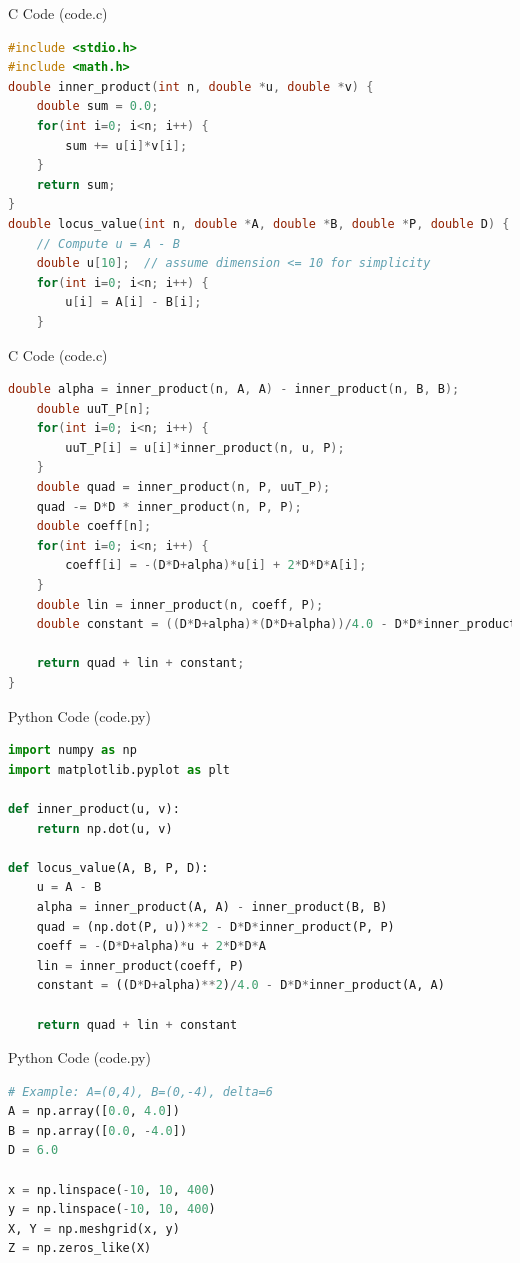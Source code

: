 \documentclass{beamer}
\begin{document}
\begin{frame}[fragile]{C Code (code.c)}
\begin{lstlisting}[language=C]
#include <stdio.h>
#include <math.h>
double inner_product(int n, double *u, double *v) {
    double sum = 0.0;
    for(int i=0; i<n; i++) {
        sum += u[i]*v[i];
    }
    return sum;
}
double locus_value(int n, double *A, double *B, double *P, double D) {
    // Compute u = A - B
    double u[10];  // assume dimension <= 10 for simplicity
    for(int i=0; i<n; i++) {
        u[i] = A[i] - B[i];
    }
\end{lstlisting}
\end{frame}
\begin{frame}[fragile]{C Code (code.c)}
\begin{lstlisting}[language=C]
    double alpha = inner_product(n, A, A) - inner_product(n, B, B);
    double uuT_P[n];
    for(int i=0; i<n; i++) {
        uuT_P[i] = u[i]*inner_product(n, u, P);
    }
    double quad = inner_product(n, P, uuT_P);
    quad -= D*D * inner_product(n, P, P);
    double coeff[n];
    for(int i=0; i<n; i++) {
        coeff[i] = -(D*D+alpha)*u[i] + 2*D*D*A[i];
    }
    double lin = inner_product(n, coeff, P);
    double constant = ((D*D+alpha)*(D*D+alpha))/4.0 - D*D*inner_product(n, A, A);

    return quad + lin + constant;
}
\end{lstlisting}
\end{frame}

\begin{frame}[fragile]{Python Code (code.py)}
\begin{lstlisting}[language=Python]
import numpy as np
import matplotlib.pyplot as plt

def inner_product(u, v):
    return np.dot(u, v)

def locus_value(A, B, P, D):
    u = A - B
    alpha = inner_product(A, A) - inner_product(B, B)
    quad = (np.dot(P, u))**2 - D*D*inner_product(P, P)
    coeff = -(D*D+alpha)*u + 2*D*D*A
    lin = inner_product(coeff, P)
    constant = ((D*D+alpha)**2)/4.0 - D*D*inner_product(A, A)

    return quad + lin + constant

\end{lstlisting}
\end{frame}

\begin{frame}[fragile]{Python Code (code.py)}
\begin{lstlisting}[language=Python]
# Example: A=(0,4), B=(0,-4), delta=6
A = np.array([0.0, 4.0])
B = np.array([0.0, -4.0])
D = 6.0

x = np.linspace(-10, 10, 400)
y = np.linspace(-10, 10, 400)
X, Y = np.meshgrid(x, y)
Z = np.zeros_like(X)



\end{lstlisting}
\end{frame}
\end{document}
